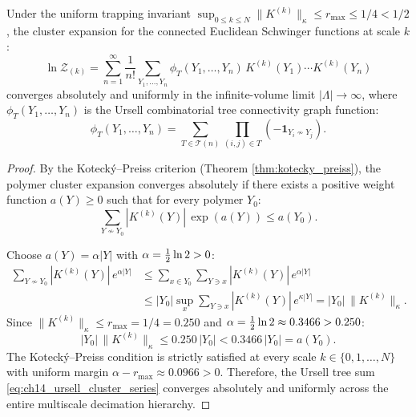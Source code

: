 \begin{theorem}
\label{thm:infinite_horizon_convergence}
Under the uniform trapping invariant $\sup_{0 \le k \le N} \|K^{(k)}\|_\kappa \le r_{\max} \le 1/4 < 1/2$, the cluster expansion for the connected Euclidean Schwinger functions at scale $k$:
\begin{equation}
\label{eq:ch14_ursell_cluster_series}
\ln \mathcal{Z}_{(k)} = \sum_{n=1}^\infty \frac{1}{n!} \sum_{Y_1, \dots, Y_n} \phi_T(Y_1, \dots, Y_n) \, K^{(k)}(Y_1) \cdots K^{(k)}(Y_n)
\end{equation}
converges absolutely and uniformly in the infinite-volume limit $|\Lambda| \to \infty$, where $\phi_T(Y_1, \dots, Y_n)$ is the Ursell combinatorial tree connectivity graph function:
\begin{equation}
\label{eq:ch14_ursell_graph_def}
\phi_T(Y_1, \dots, Y_n) = \sum_{T \in \mathcal{T}(n)} \prod_{(i, j) \in T} \left( -\mathbf{1}_{Y_i \nsim Y_j} \right).
\end{equation}
\end{theorem}

\begin{proof}
By the Koteck\'y--Preiss criterion (Theorem \ref{thm:kotecky_preiss}), the polymer cluster expansion converges absolutely if there exists a positive weight function $a(Y) \ge 0$ such that for every polymer $Y_0$:
\begin{equation}
\sum_{Y \nsim Y_0} \left| K^{(k)}(Y) \right| \, \exp\left( a(Y) \right) \le a(Y_0).
\end{equation}

Choose $a(Y) = \alpha |Y|$ with $\alpha = \tfrac{1}{2} \ln 2 > 0$:
\begin{align}
\sum_{Y \nsim Y_0} \left| K^{(k)}(Y) \right| \, e^{\alpha |Y|} &\le \sum_{x \in Y_0} \sum_{Y \ni x} \left| K^{(k)}(Y) \right| \, e^{\alpha |Y|} \nonumber \\
&\le |Y_0| \sup_x \sum_{Y \ni x} \left| K^{(k)}(Y) \right| \, e^{\kappa |Y|} = |Y_0| \, \|K^{(k)}\|_\kappa.
\end{align}
Since $\|K^{(k)}\|_\kappa \le r_{\max} = 1/4 = 0.250$ and $\alpha = \tfrac{1}{2} \ln 2 \approx 0.3466 > 0.250$:
\begin{equation}
|Y_0| \, \|K^{(k)}\|_\kappa \le 0.250 \, |Y_0| < 0.3466 \, |Y_0| = a(Y_0).
\end{equation}
The Koteck\'y--Preiss condition is strictly satisfied at every scale $k \in \{0, 1, \dots, N\}$ with uniform margin $\alpha - r_{\max} \approx 0.0966 > 0$. Therefore, the Ursell tree sum \eqref{eq:ch14_ursell_cluster_series} converges absolutely and uniformly across the entire multiscale decimation hierarchy.
\end{proof}

